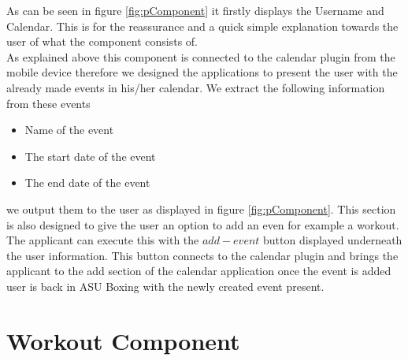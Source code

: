 \documentclass[a4paper,12pt]{report}
\begin{document}
As can be seen in figure \ref{fig:pComponent} it firstly displays the Username and Calendar. This is for the reassurance and a quick simple explanation towards the user of what the component consists of.\\
As explained above this component is connected to the calendar plugin from the mobile device therefore we designed the applications to present the user with the already made events in his/her calendar.
We extract the following information from these events 
\begin{itemize}
    \item Name of the event
    \item The start date of the event
    \item The end date of the event
\end{itemize}
we output them to the user as displayed in figure \ref{fig:pComponent}.
This section is also designed to give the user an option to add an even for example a workout. The applicant can execute this with the $add-event$ button displayed underneath the user information.
This button connects to the calendar plugin and brings the applicant to the add section of the calendar application once the event is added user is back in  ASU Boxing with the newly created event present.

\section{Workout Component}
    
\end{document}
